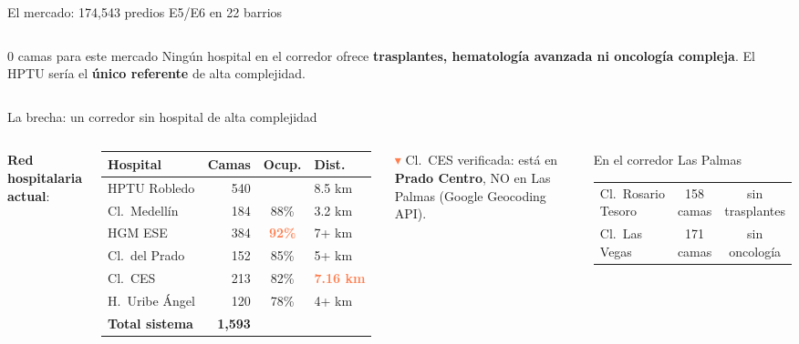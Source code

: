 \documentclass[aspectratio=169, 11pt]{beamer}
\newcommand{\danger}[1]{\textcolor{coral}{\textbf{#1}}}
\begin{document}
\begin{frame}{El mercado: 174,543 predios E5/E6 en 22 barrios}
\begin{columns}[T]
\vspace{4pt}
\begin{alertblock}{\small 0 camas para este mercado}
\footnotesize Ningún hospital en el corredor ofrece \textbf{trasplantes, hematología avanzada ni oncología compleja}. El HPTU sería el \textbf{único referente} de alta complejidad.
\end{alertblock}
\end{columns}
\end{frame}

{
\begin{frame}{La brecha: un corredor sin hospital de alta complejidad}

\begin{columns}[T]
\textbf{Red hospitalaria actual}:

\vspace{4pt}
{\scriptsize
\begin{tabular}{@{}lrcl@{}}
\toprule
\textbf{Hospital} & \textbf{Camas} & \textbf{Ocup.} & \textbf{Dist.} \\
\midrule
\rowcolor{coral!10}
HPTU Robledo & 540 & & 8.5 km \\
Cl.\ Medellín & 184 & 88\% & 3.2 km \\
\rowcolor{coral!6}
HGM ESE & 384 & \danger{92\%} & 7+ km \\
Cl.\ del Prado & 152 & 85\% & 5+ km \\
Cl.\ CES & 213 & 82\% & \danger{7.16 km} \\
H.\ Uribe Ángel & 120 & 78\% & 4+ km \\
\midrule
\textbf{Total sistema} & \textbf{1,593} & & \\
\bottomrule
\end{tabular}
}

\vspace{4pt}
{\scriptsize\textcolor{coral}{$\blacktriangledown$} Cl.\ CES verificada: está en \textbf{Prado Centro}, NO en Las Palmas (Google Geocoding API).}

\vspace{4pt}
\begin{block}{\small En el corredor Las Palmas}
\footnotesize
\begin{tabular}{@{}lcc@{}}
Cl.\ Rosario Tesoro & 158 camas & \footnotesize sin trasplantes \\
Cl.\ Las Vegas & 171 camas & \footnotesize sin oncología \\
\end{tabular}


\end{block}
\end{columns}
\end{frame}}
\end{document}
